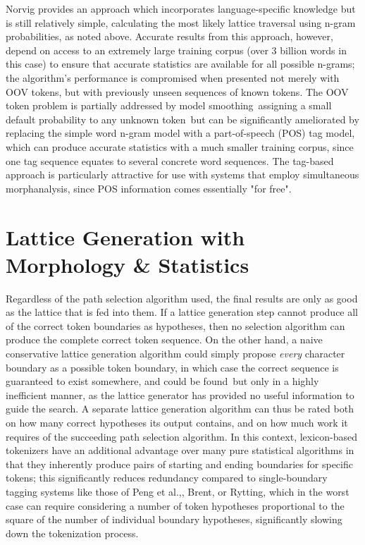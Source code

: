Norvig\cite{norvig14} provides an approach which incorporates language-specific knowledge but is still relatively simple, calculating the most likely lattice traversal using n-gram probabilities, as noted above. Accurate results from this approach, however, depend on access to an extremely large training corpus (over 3 billion words in this case) to ensure that accurate statistics are available for all possible n-grams; the algorithm's performance is compromised when presented not merely with OOV tokens, but with previously unseen sequences of known tokens. The OOV token problem is partially addressed by model smoothing\textemdash~assigning a small default probability to any unknown token\textemdash~but can be significantly ameliorated by replacing the simple word n-gram model with a part-of-speech (POS) tag model, which can produce accurate statistics with a much smaller training corpus, since one tag sequence equates to several concrete word sequences. The tag-based approach is particularly attractive for use with systems that employ simultaneous morphanalysis, since POS information comes essentially "for free".

\section{Lattice Generation with Morphology \& Statistics}

Regardless of the path selection algorithm used, the final results are only as good as the lattice that is fed into them. If a lattice generation step cannot produce all of the correct token boundaries as hypotheses, then no selection algorithm can produce the complete correct token sequence. On the other hand, a naive conservative lattice generation algorithm could simply propose \textit{every} character boundary as a possible token boundary, in which case the correct sequence is guaranteed to exist somewhere, and could be found\textemdash~but only in a highly inefficient manner, as the lattice generator has provided no useful information to guide the search. A separate lattice generation algorithm can thus be rated both on how many correct hypotheses its output contains, and on how much work it requires of the succeeding path selection algorithm. In this context, lexicon-based tokenizers have an additional advantage over many pure statistical algorithms in that they inherently produce pairs of starting and ending boundaries for specific tokens; this significantly reduces redundancy compared to single-boundary tagging systems\cite{kudo04} like those of Peng et al.,\cite{peng04}, Brent\cite{brent99}, or Rytting\cite{rytting04}, which in the worst case can require considering a number of token hypotheses proportional to the square of the number of individual boundary hypotheses, significantly slowing down the tokenization process.

